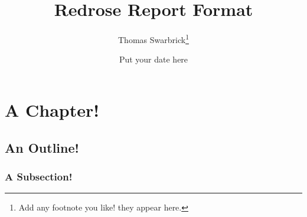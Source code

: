 \documentclass[]{scrreprt}
\title{Redrose Report Format}
\author{Thomas Swarbrick\footnote{Add any footnote you like! they appear here.}}
\date{Put your date here}
\begin{document}
\maketitle

\chapter{A Chapter!}
\section{An Outline!}

\subsection{A Subsection!}
\end{document}
